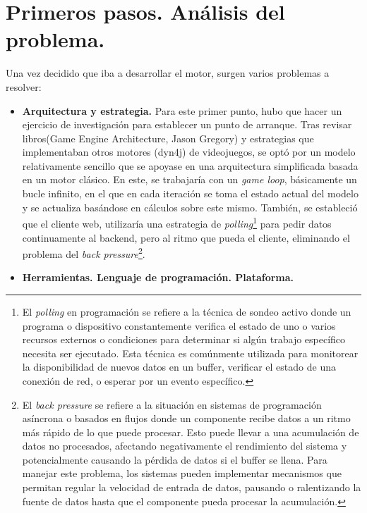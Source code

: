 \section{Primeros pasos. Análisis del problema.}
Una vez decidido que iba a desarrollar el motor, surgen varios problemas a resolver:
\begin{itemize}
    \item \textbf{Arquitectura y estrategia.}
    Para este primer punto, hubo que hacer un ejercicio de investigación para establecer un punto de arranque. Tras revisar libros(\cite{GregoryGameEngine}Game Engine Architecture, Jason Gregory) y estrategias que implementaban otros motores (\cite{dyn4j}dyn4j) de videojuegos, se optó por un modelo relativamente sencillo que se apoyase en una arquitectura simplificada basada en un motor clásico. En este, se trabajaría con un \textit{game loop}, básicamente un bucle infinito, en el que en cada iteración se toma el estado actual del modelo y se actualiza basándose en cálculos sobre este mismo. También, se estableció que el cliente web, utilizaría una estrategia de \textit{polling}\footnote{El \textit{polling} en programación se refiere a la técnica de sondeo activo donde un programa o dispositivo constantemente verifica el estado de uno o varios recursos externos o condiciones para determinar si algún trabajo específico necesita ser ejecutado. Esta técnica es comúnmente utilizada para monitorear la disponibilidad de nuevos datos en un buffer, verificar el estado de una conexión de red, o esperar por un evento específico.} para pedir datos continuamente al backend, pero al ritmo que pueda el cliente, eliminando el problema del \textit{back pressure}\footnote{El \textit{back pressure} se refiere a la situación en sistemas de programación asíncrona o basados en flujos donde un componente recibe datos a un ritmo más rápido de lo que puede procesar. Esto puede llevar a una acumulación de datos no procesados, afectando negativamente el rendimiento del sistema y potencialmente causando la pérdida de datos si el buffer se llena. Para manejar este problema, los sistemas pueden implementar mecanismos que permitan regular la velocidad de entrada de datos, pausando o ralentizando la fuente de datos hasta que el componente pueda procesar la acumulación.}.
    \item \textbf{Herramientas. Lenguaje de programación. Plataforma.}

\end{itemize}
